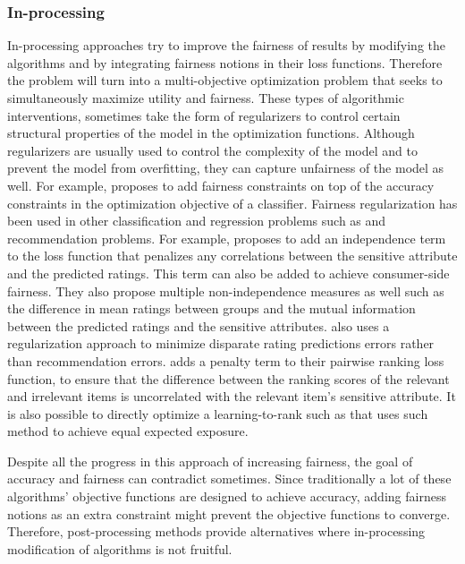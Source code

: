 \subsubsection{In-processing}
In-processing approaches try to improve the fairness of results by modifying the algorithms and by integrating fairness notions in their loss functions. Therefore the problem will turn into a multi-objective optimization problem that seeks to simultaneously maximize utility and fairness.
These types of algorithmic interventions, sometimes take the form of regularizers to control certain structural properties of the model in the optimization functions. 
Although regularizers are usually used to control the complexity of the model and to prevent the model from overfitting, they can capture unfairness of the model as well. For example, \cite{zafar2017fairness} proposes to add fairness constraints on top of the accuracy constraints in the optimization objective of a classifier. Fairness regularization has been used in other classification and regression problems such as \cite{kamishima2012fairness,berk2017convex} and recommendation problems. For example, \cite{kamishima2018recommendation, kamishima-} proposes to add an independence term to the loss function that penalizes any correlations between the sensitive attribute and the predicted ratings. This term can also be added to achieve consumer-side fairness\cite{kamishima2017considerations}. They also propose multiple non-independence measures as well such as the difference in mean ratings between groups and the mutual information between the predicted ratings and the sensitive attributes. \cite{yao_huang_fatml-2017} also uses a regularization approach to minimize disparate rating predictions errors rather than recommendation errors. \cite{beutel2017data} adds a penalty term to their pairwise ranking loss function, to ensure that the difference between the ranking scores of the relevant and irrelevant items is uncorrelated with the relevant item's sensitive attribute. It is also possible to directly optimize a learning-to-rank such as \cite{diaz2020} that uses such method to achieve equal expected exposure.

Despite all the progress in this approach of increasing fairness, the goal of accuracy and fairness can contradict sometimes. Since traditionally a lot of these algorithms' objective functions are designed to achieve accuracy, adding fairness notions as an extra constraint might prevent the objective functions to converge. Therefore, post-processing methods provide alternatives where in-processing modification of algorithms is not fruitful.


